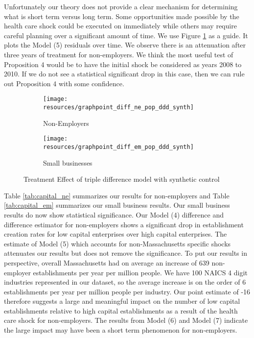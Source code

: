 \documentclass[12pt]{article}
\begin{document}
Unfortunately our theory does not provide a clear mechanism for determining what is short term versus long term. Some opportunities made possible by the health care shock could be executed on immediately while others may require careful planning over a significant amount of time. We use Figure \ref{fig:ddd} as a guide. It plots the Model (5) residuals over time. We observe there is an attenuation after three years of treatment for non-employers. We think the most useful test of Proposition 4 would be to have the initial shock be considered as years 2008 to 2010. If we do not see a statistical significant drop in this case, then we can rule out Proposition 4 with some confidence. 
\begin{figure}[H]
	\centering
	\begin{subfigure}[b]{0.495\textwidth}
		\texttt{[image: resources/graphpoint\_diff\_ne\_pop\_ddd\_synth]}
		\caption{Non-Employers}
	\end{subfigure}
		\begin{subfigure}[b]{0.495\textwidth}
		\texttt{[image: resources/graphpoint\_diff\_em\_pop\_ddd\_synth]}
		\caption{Small businesses}
	\end{subfigure}
	\caption{Treatment Effect of triple difference model with synthetic control}
	\label{fig:ddd}
\end{figure}

Table \ref{tab:capital_ne} summarizes our results for non-employers and Table \ref{tab:capital_em} summarizes our small business results. Our small business results do now show statistical significance. Our Model (4) difference and difference estimator for non-employers shows a significant drop in establishment creation rates for low capital enterprises over high capital enterprises. The estimate of Model (5) which accounts for non-Massachusetts specific shocks attenuates our results but does not remove the significance. To put our results in perspective, overall Massachusetts had on average an increase of 639 non-employer establishments per year per million people. We have 100 NAICS 4 digit industries represented in our dataset, so the average increase is on the order of 6 establishments per year per million people per industry. Our point estimate of -16 therefore suggests a large and meaningful impact on the number of low capital establishments relative to high capital establishments as a result of the health care shock for non-employers. The results from Model (6) and Model (7) indicate the large impact may have been a short term phenomenon for non-employers. 
\end{document}
